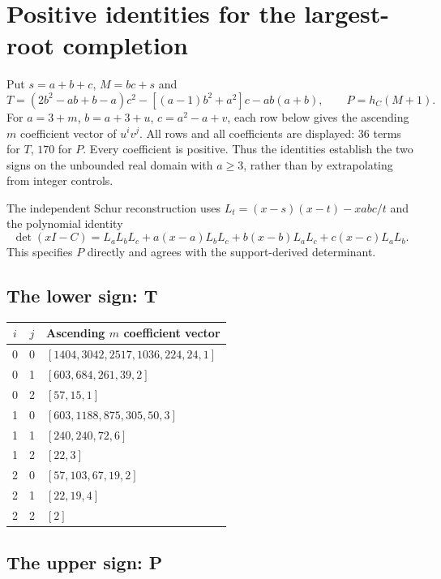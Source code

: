 \section{Positive identities for the largest-root completion}
\label{sec:largest-root-identities}

Put $s=a+b+c$, $M=bc+s$ and
\[
 T=(2b^2-ab+b-a)c^2-[(a-1)b^2+a^2]c-ab(a+b),\qquad P=h_C(M+1).
\]
For $a=3+m$, $b=a+3+u$, $c=a^2-a+v$, each row below gives the
ascending $m$ coefficient vector of $u^i v^j$. All rows and all
coefficients are displayed: $36$ terms for $T$, $170$ for $P$.
Every coefficient is positive. Thus the identities establish the two
signs on the unbounded real domain with $a\geq3$, rather than by extrapolating
from integer controls.

The independent Schur reconstruction uses
$L_t=(x-s)(x-t)-xabc/t$ and the polynomial identity
\[
 \det(xI-C)=L_aL_bL_c+a(x-a)L_bL_c+b(x-b)L_aL_c+c(x-c)L_aL_b.
\]
This specifies $P$ directly and agrees with the support-derived determinant.

\subsection{The lower sign: T}

\begingroup
\scriptsize
\setlength{\tabcolsep}{4pt}
\noindent\begin{tabular}{ccp{13.6cm}}
\toprule
$i$ & $j$ & Ascending $m$ coefficient vector\\
\midrule
0 & 0 & $[1404,\allowbreak 3042,\allowbreak 2517,\allowbreak 1036,\allowbreak 224,\allowbreak 24,\allowbreak 1]$\\
0 & 1 & $[603,\allowbreak 684,\allowbreak 261,\allowbreak 39,\allowbreak 2]$\\
0 & 2 & $[57,\allowbreak 15,\allowbreak 1]$\\
1 & 0 & $[603,\allowbreak 1188,\allowbreak 875,\allowbreak 305,\allowbreak 50,\allowbreak 3]$\\
1 & 1 & $[240,\allowbreak 240,\allowbreak 72,\allowbreak 6]$\\
1 & 2 & $[22,\allowbreak 3]$\\
2 & 0 & $[57,\allowbreak 103,\allowbreak 67,\allowbreak 19,\allowbreak 2]$\\
2 & 1 & $[22,\allowbreak 19,\allowbreak 4]$\\
2 & 2 & $[2]$\\
\bottomrule
\end{tabular}
\endgroup

\subsection{The upper sign: P}

